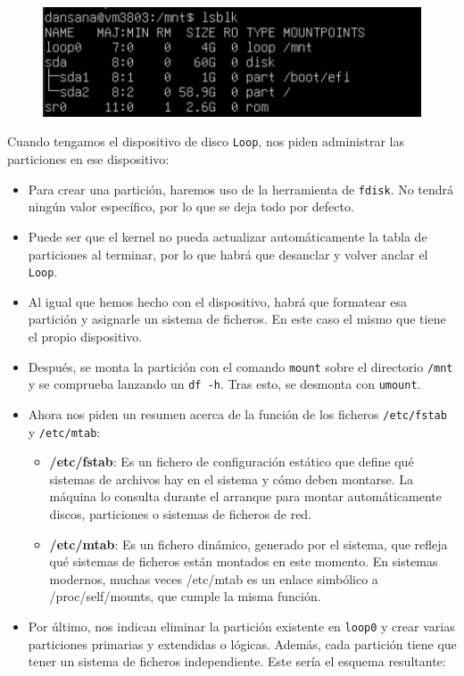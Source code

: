 \documentclass[10pt]{article}
\begin{document}
	\begin{figure}[H]
		\setlength{\abovecaptionskip}{0cm}
		\setlength{\belowcaptionskip}{0cm}
		\centering
		\includegraphics[width=0.6\linewidth]{Recursos/loop0.png}
	\end{figure}
	
	Cuando tengamos el dispositivo de disco \verb|Loop|, nos piden administrar las particiones en ese dispositivo:
	\begin{itemize}
		\item Para crear una partición, haremos uso de la herramienta de \verb|fdisk|. No tendrá ningún valor específico, por lo que se deja todo por defecto.
		\item Puede ser que el kernel no pueda actualizar automáticamente la tabla de particiones al terminar, por lo que habrá que desanclar y volver anclar el \verb|Loop|.
		\item Al igual que hemos hecho con el dispositivo, habrá que formatear esa partición y asignarle un sistema de ficheros. En este caso el mismo que tiene el propio dispositivo.
		\item Después, se monta la partición con el comando \verb|mount| sobre el directorio \verb|/mnt| y se comprueba lanzando un \verb|df -h|. Tras esto, se desmonta con \verb|umount|.
		\item Ahora nos piden un resumen acerca de la función de los ficheros \verb|/etc/fstab| y \verb|/etc/mtab|:
		\begin{itemize}
			\item \textbf{/etc/fstab}: Es un fichero de configuración estático que define qué sistemas de archivos hay en el sistema y cómo deben montarse. La máquina lo consulta durante el arranque para montar automáticamente discos, particiones o sistemas de ficheros de red.
			\item \textbf{/etc/mtab}: Es un fichero dinámico, generado por el sistema, que refleja qué sistemas de ficheros están montados en este momento. En sistemas modernos, muchas veces /etc/mtab es un enlace simbólico a /proc/self/mounts, que cumple la misma función.
		\end{itemize}
		\item Por último, nos indican eliminar la partición existente en \verb|loop0| y crear varias particiones primarias y extendidas o lógicas. Además, cada partición tiene que tener un sistema de ficheros independiente. Este sería el esquema resultante:

\end{itemize}
\end{document}
